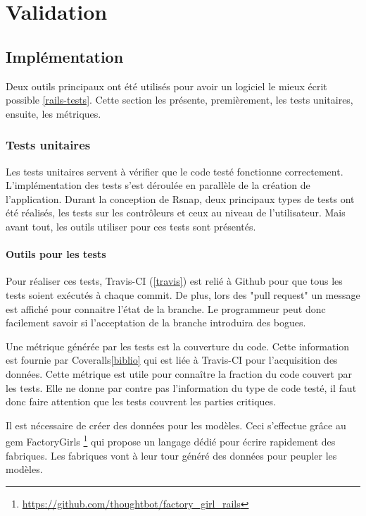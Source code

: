 ﻿\chapter{Validation}

\section{Implémentation}
Deux outils principaux ont été utilisés pour avoir un logiciel le mieux écrit possible \ref{rails-tests}. Cette section les présente, premièrement, les tests unitaires, ensuite, les métriques.

\subsection{Tests unitaires}
Les tests unitaires servent à vérifier que le code testé fonctionne correctement. L'implémentation des tests s'est déroulée en parallèle de la création de l'application. Durant la conception de Rsnap, deux principaux types de tests ont été réalisés, les tests sur les contrôleurs et ceux au niveau de l'utilisateur. Mais avant tout, les outils utiliser pour ces tests sont présentés.

\subsubsection{Outils pour les tests}
Pour réaliser ces tests, Travis-CI (\ref{travis}) est relié à Github pour que tous les tests soient exécutés à chaque commit. De plus, lors des "pull request" un message est affiché pour connaitre l'état de la branche. Le programmeur peut donc facilement savoir si l'acceptation de la branche introduira des bogues.

Une métrique générée par les tests est la couverture du code. Cette information est fournie par Coveralls\ref{biblio} qui est liée à Travis-CI pour l'acquisition des données. Cette métrique est utile pour connaître la fraction du code couvert par les tests. Elle ne donne par contre pas l'information du type de code testé, il faut donc faire attention que les tests couvrent les parties critiques.

Il est nécessaire de créer des données pour les modèles. Ceci s'effectue grâce au gem FactoryGirls \footnote{\url{https://github.com/thoughtbot/factory_girl_rails}} qui propose un langage dédié pour écrire rapidement des fabriques. Les fabriques vont à leur tour généré des données pour peupler les modèles.

